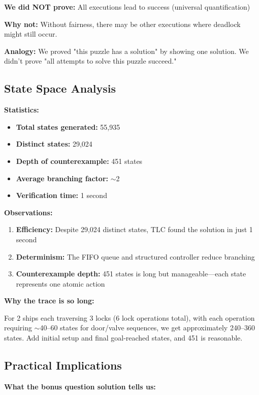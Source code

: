 \documentclass[12pt,a4paper]{article}
\begin{document}
\textbf{We did NOT prove:} All executions lead to success (universal quantification)

\textbf{Why not:} Without fairness, there may be other executions where deadlock might still occur.

\textbf{Analogy:} We proved "this puzzle has a solution" by showing one solution. We didn't prove "all attempts to solve this puzzle succeed."

\subsection{State Space Analysis}

\textbf{Statistics:}
\begin{itemize}
    \item \textbf{Total states generated:} 55,935
    \item \textbf{Distinct states:} 29,024
    \item \textbf{Depth of counterexample:} 451 states
    \item \textbf{Average branching factor:} $\sim$2
    \item \textbf{Verification time:} 1 second
\end{itemize}

\textbf{Observations:}
\begin{enumerate}
    \item \textbf{Efficiency:} Despite 29,024 distinct states, TLC found the solution in just 1 second
    \item \textbf{Determinism:} The FIFO queue and structured controller reduce branching
    \item \textbf{Counterexample depth:} 451 states is long but manageable---each state represents one atomic action
\end{enumerate}

\textbf{Why the trace is so long:}

For 2 ships each traversing 3 locks (6 lock operations total), with each operation requiring $\sim$40--60 states for door/valve sequences, we get approximately 240--360 states. Add initial setup and final goal-reached states, and 451 is reasonable.

\subsection{Practical Implications}

\textbf{What the bonus question solution tells us:}
\end{document}
